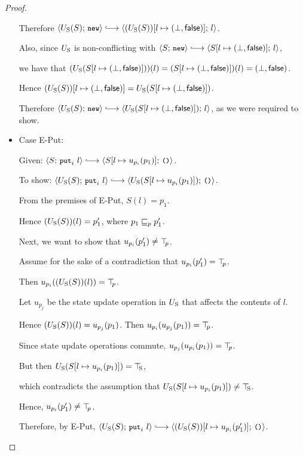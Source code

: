 \begin{proof}
\begin{itemize}
    Therefore $\config{\Ustore(S)}{\NEW} \parstepsto
    \config{\extS{(\Ustore(S))}{l}{\bot}{\frozenfalse}}{l}$.

    Also, since $U_{\mathrm{S}}$ is non-conflicting with $\config{S}{\NEW}
    \parstepsto \config{\extS{S}{l}{\bot}{\frozenfalse}}{l}$,

    we have that $(U_{\mathrm{S}}(S[l \mapsto (\bot, \textsf{false})]))(l) =
    (S[l \mapsto (\bot, \textsf{false})])(l) =
    (\bot, \textsf{false})$.

    Hence $(U_{\mathrm{S}}(S))[l \mapsto (\bot, \textsf{false})] =
    U_{\mathrm{S}}(S[l \mapsto (\bot, \textsf{false})])$.

    Therefore $\config{\Ustore(S)}{\NEW} \parstepsto
    \config{\Ustore(\extS{S}{l}{\bot}{\frozenfalse})}{l}$, as we were
    required to show.

  \item Case {\sc E-Put}:

    Given: $\config{S}{\putiexp{l}} \parstepsto
    \config{\extSRaw{S}{l}{u_{p_i}(p_1)}}{\unit}$.

    To show: $\config{\Ustore(S)}{\putiexp{l}} \parstepsto
    \config{\Ustore(\extSRaw{S}{l}{u_{p_i}(p_1)})}{\unit}$.

    From the premises of {\sc E-Put}, $S(l) = p_1$.

    Hence $(U_{\mathrm{S}}(S))(l) = p'_1$, where $p_1 \sqsubseteq_p p'_1$.

    Next, we want to show that $u_{p_i}(p'_1) \neq \top\hspace{-0.85mm}_{p}$.

    Assume for the sake of a contradiction that $u_{p_i}(p'_1) =
    \top\hspace{-0.85mm}_{p}$.

    Then $u_{p_i}((U_{\mathrm{S}}(S))(l)) = \top\hspace{-0.85mm}_{p}$.

    Let $u_{p_j}$ be the state update operation in $U_{\mathrm{S}}$ that affects
    the contents of $l$.

    Hence $(U_{\mathrm{S}}(S))(l) = u_{p_j}(p_1)$. Then $u_{p_i}(u_{p_j}(p_1)) =
    \top\hspace{-0.85mm}_{p}$.

    Since state update operations commute, $u_{p_j}(u_{p_i}(p_1)) =
    \top\hspace{-0.85mm}_{p}$.
    
    But then $U_{\mathrm{S}}(S[l \mapsto u_{p_i}(p_1)]) = \top\hspace{-0.85mm}_{\mathrm{S}}$,

    which contradicts the assumption that
    $U_{\mathrm{S}}(S[l \mapsto u_{p_i}(p_1)]) \neq \top\hspace{-0.85mm}_{\mathrm{S}}$.

    Hence, $u_{p_i}(p'_1) \neq \top\hspace{-0.85mm}_{p}$.

    Therefore, by {\sc E-Put}, $\config{\Ustore(S)}{\putiexp{l}}
    \parstepsto \config{\extSRaw{(\Ustore(S))}{l}{u_{p_i}(p'_1)}}{\unit}$.


\end{itemize}
\end{proof}
